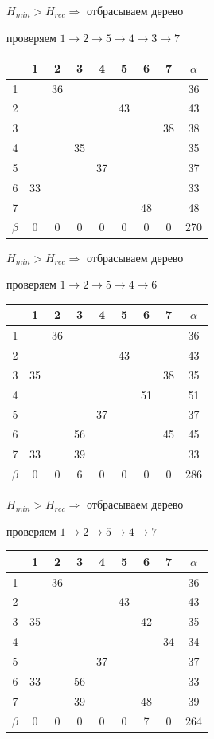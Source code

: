 \documentclass[russian]{article}
\begin{document}
$H_{min} > H_{rec} \Rightarrow $ отбрасываем дерево

проверяем 
$1 \to 2 \to 5 \to 4 \to 3 \to 7$

\begin{tabular}{|c|c|c|c|c|c|c|c|c|}\hline
& 1& 2& 3& 4& 5& 6& 7& $\alpha$\\\hline
1& & 36& & & & & & 36\\\hline
2& & & & & 43& & & 43\\\hline
3& & & & & & & 38& 38\\\hline
4& & & 35& & & & & 35\\\hline
5& & & & 37& & & & 37\\\hline
6& 33& & & & & & & 33\\\hline
7& & & & & & 48& & 48\\\hline
$\beta$& 0& 0& 0& 0& 0& 0& 0& 270\\\hline
\end{tabular}

$H_{min} > H_{rec} \Rightarrow $ отбрасываем дерево

проверяем 
$1 \to 2 \to 5 \to 4 \to 6$

\begin{tabular}{|c|c|c|c|c|c|c|c|c|}\hline
& 1& 2& 3& 4& 5& 6& 7& $\alpha$\\\hline
1& & 36& & & & & & 36\\\hline
2& & & & & 43& & & 43\\\hline
3& 35& & & & & & 38& 35\\\hline
4& & & & & & 51& & 51\\\hline
5& & & & 37& & & & 37\\\hline
6& & & 56& & & & 45& 45\\\hline
7& 33& & 39& & & & & 33\\\hline
$\beta$& 0& 0& 6& 0& 0& 0& 0& 286\\\hline
\end{tabular}

$H_{min} > H_{rec} \Rightarrow $ отбрасываем дерево

проверяем 
$1 \to 2 \to 5 \to 4 \to 7$

\begin{tabular}{|c|c|c|c|c|c|c|c|c|}\hline
& 1& 2& 3& 4& 5& 6& 7& $\alpha$\\\hline
1& & 36& & & & & & 36\\\hline
2& & & & & 43& & & 43\\\hline
3& 35& & & & & 42& & 35\\\hline
4& & & & & & & 34& 34\\\hline
5& & & & 37& & & & 37\\\hline
6& 33& & 56& & & & & 33\\\hline
7& & & 39& & & 48& & 39\\\hline
$\beta$& 0& 0& 0& 0& 0& 7& 0& 264\\\hline
\end{tabular}
\end{document}
